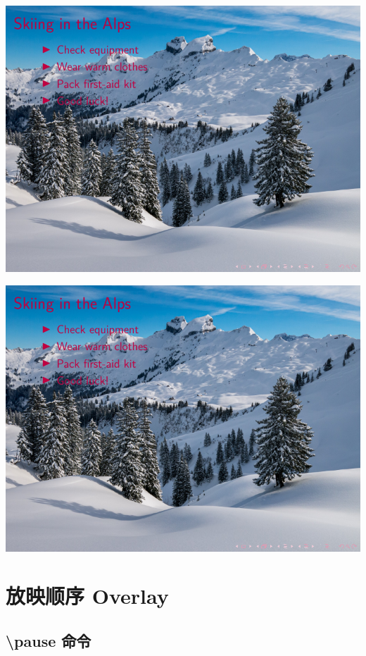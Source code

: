 \begin{column}{0.5\textwidth}
\includegraphics[page=1]{examples/beamer/beamertheme12.pdf}

\includegraphics[page=2]{examples/beamer/beamertheme12.pdf}

\section{放映顺序 Overlay}

\subsection{{\ttfamily \textbackslash pause} 命令}


\end{column}
